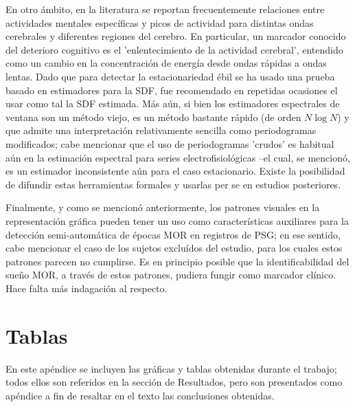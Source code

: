 \documentclass[12pt,a4paper]{mitthesis}
\begin{document}
En otro \'ambito, en la literatura se reportan frecuentemente relaciones entre actividades mentales 
espec\'ificas y picos de actividad para distintas ondas cerebrales y diferentes regiones del 
cerebro.
En particular, un marcador conocido del deterioro cognitivo es el 'enlentecimiento de la actividad
cerebral', entendido como un cambio en la concentraci\'on de energ\'ia desde ondas r\'apidas a 
ondas lentas.
Dado que para detectar la estacionariedad \'ebil se ha usado una prueba basado en estimadores para la 
SDF, fue recomendado en repetidas ocasiones el usar como tal la SDF estimada. 
M\'as a\'un, si bien los estimadores espectrales de ventana son un m\'etodo viejo, es un m\'etodo 
bastante r\'apido (de orden $N \log{N}$) y que admite una interpretaci\'on relativamente sencilla 
como periodogramas modificados; cabe mencionar que el uso de periodogramas 'crudos' es habitual 
a\'un en la estimaci\'on espectral para series electrofisiol\'ogicas --el cual, se mencion\'o, es 
un estimador inconsistente a\'un para el caso estacionario.
Existe la posibilidad de difundir estas herramientas formales y usarlas per se en estudios
posteriores.


Finalmente, y como se mencion\'o anteriormente, los patrones visuales en la representaci\'on 
gr\'afica pueden tener un uso como caracter\'isticas auxiliares para la detecci\'on 
semi-autom\'atica de \'epocas MOR en registros de PSG; en ese sentido, cabe mencionar el caso de 
los sujetos exclu\'idos del estudio, para los cuales estos patrones parecen no cumplirse. 
Es en principio posible que la identificabilidad del sue\~no MOR, a trav\'es de estos patrones, 
pudiera fungir como marcador cl\'inico. Hace falta m\'as indagaci\'on al respecto. 


\appendix

\chapter{Tablas}

En este ap\'endice se incluyen las gr\'aficas y tablas obtenidas durante el trabajo; todos ellos 
son referidos en la secci\'on de Resultados, pero son presentados como ap\'endice a fin de resaltar 
en el texto las conclusiones obtenidas.
\end{document}
